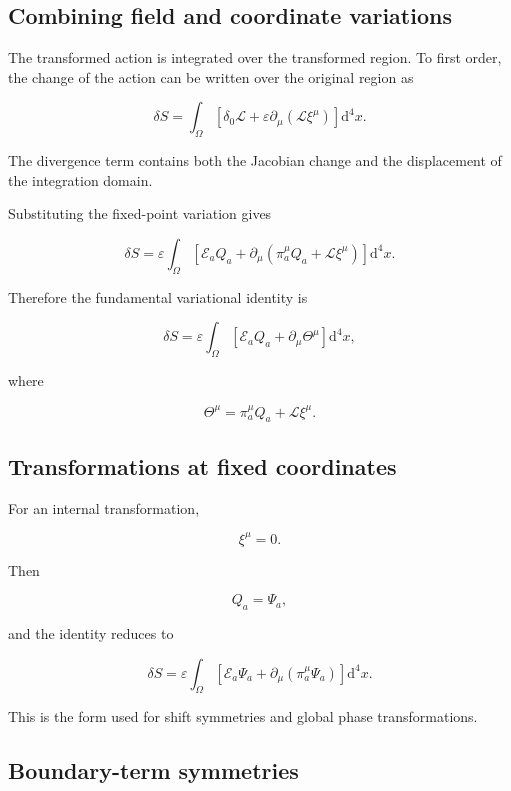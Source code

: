 \subsection{Combining field and coordinate variations}

The transformed action is integrated over the transformed region. To first order, the change of the action can be written over the original region as

\[
\delta S
=
\int_{\Omega}
\left[
\delta_0\mathcal{L}
+
\varepsilon
\partial_{\mu}
\left(
\mathcal{L}\xi^{\mu}
\right)
\right]
\mathrm{d}^{4}x.
\]

The divergence term contains both the Jacobian change and the displacement of the integration domain.

Substituting the fixed-point variation gives

\[
\delta S
=
\varepsilon
\int_{\Omega}
\left[
\mathcal{E}_aQ_a
+
\partial_{\mu}
\left(
\pi_a^{\mu}Q_a
+
\mathcal{L}\xi^{\mu}
\right)
\right]
\mathrm{d}^{4}x.
\]

Therefore the fundamental variational identity is

\[
\boxed{
\delta S
=
\varepsilon
\int_{\Omega}
\left[
\mathcal{E}_aQ_a
+
\partial_{\mu}
\Theta^{\mu}
\right]
\mathrm{d}^{4}x
},
\]

where

\[
\boxed{
\Theta^{\mu}
=
\pi_a^{\mu}Q_a
+
\mathcal{L}\xi^{\mu}
}.
\]

\subsection{Transformations at fixed coordinates}

For an internal transformation,

\[
\xi^{\mu}=0.
\]

Then

\[
Q_a=\Psi_a,
\]

and the identity reduces to

\[
\boxed{
\delta S
=
\varepsilon
\int_{\Omega}
\left[
\mathcal{E}_a\Psi_a
+
\partial_{\mu}
\left(
\pi_a^{\mu}\Psi_a
\right)
\right]
\mathrm{d}^{4}x
}.
\]

This is the form used for shift symmetries and global phase transformations.

\subsection{Boundary-term symmetries}

